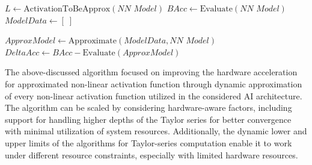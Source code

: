 \documentclass[runningheads]{llncs}
\begin{document}
\begin{algorithm}[h]
    \caption{General Purpose Non-linear Approximation Algorithm}
    \label{alg:approximator}
    
    $L \gets \text{ActivationToBeApprox}(\textit{NN Model})$\;
    $BAcc \gets \text{Evaluate}(\textit{NN Model})$\;
    $ModelData \gets [\;]$\;
    
    
    $ApproxModel \gets \text{Approximate}(\textit{ModelData}, \textit{NN Model})$\;
    $DeltaAcc \gets BAcc - \text{Evaluate}(\textit{ApproxModel})$\;
    
    
    \;

\end{algorithm}

The above-discussed algorithm focused on improving the hardware acceleration for approximated non-linear activation function through dynamic approximation of every non-linear activation function utilized in the considered AI architecture. The algorithm can be scaled by considering hardware-aware factors, including support for handling higher depths of the Taylor series for better convergence with minimal utilization of system resources. Additionally, the dynamic lower and upper limits of the algorithms for Taylor-series computation enable it to work under different resource constraints, especially with limited hardware resources.
\end{document}
